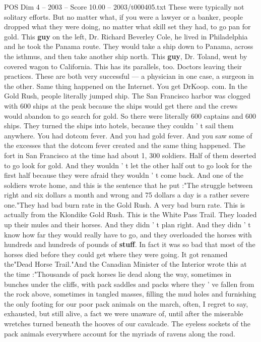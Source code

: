 \begin{textsample}{POS Dim 4 – 2003 – Score 10.00 – 2003/t000405.txt}
These were typically not solitary efforts.
But no matter what, if you were a lawyer or a banker, people dropped what they were doing, no matter what skill set they had, to go pan for gold.
This \textbf{guy} on the left, Dr.
Richard Beverley Cole, he lived in Philadelphia and he took the Panama route.
They would take a ship down to Panama, across the isthmus, and then take another ship north.
This \textbf{guy}, Dr.
Toland, went by covered wagon to California.
This has its parallels, too.
Doctors leaving their practices.
These are both very successful — a physician in one case, a surgeon in the other.
Same thing happened on the Internet.
You get DrKoop. com.
In the Gold Rush, people literally jumped ship.
The San Francisco harbor was clogged with 600 ships at the peak because the ships would get there and the crews would abandon to go search for gold.
So there were literally 600 captains and 600 ships.
They turned the ships into hotels, because they couldn ' t sail them anywhere.
You had dotcom fever.
And you had gold fever.
And you saw some of the excesses that the dotcom fever created and the same thing happened.
The fort in San Francisco at the time had about 1, 300 soldiers.
Half of them deserted to go look for gold.
And they wouldn ' t let the other half out to go look for the first half because they were afraid they wouldn ' t come back.
And one of the soldiers wrote home, and this is the sentence that he put :"The struggle between right and six dollars a month and wrong and 75 dollars a day is a rather severe one."They had bad burn rate in the Gold Rush.
A very bad burn rate.
This is actually from the Klondike Gold Rush.
This is the White Pass Trail.
They loaded up their mules and their horses.
And they didn ' t plan right.
And they didn ' t know how far they would really have to go, and they overloaded the horses with hundreds and hundreds of pounds of \textbf{stuff}.
In fact it was so bad that most of the horses died before they could get where they were going.
It got renamed the"Dead Horse Trail."And the Canadian Minister of the Interior wrote this at the time :"Thousands of pack horses lie dead along the way, sometimes in bunches under the cliffs, with pack saddles and packs where they ' ve fallen from the rock above, sometimes in tangled masses, filling the mud holes and furnishing the only footing for our poor pack animals on the march, often, I regret to say, exhausted, but still alive, a fact we were unaware of, until after the miserable wretches turned beneath the hooves of our cavalcade.
The eyeless sockets of the pack animals everywhere account for the myriads of ravens along the road.

\end{textsample}
